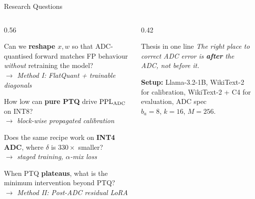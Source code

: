 \begin{frame}[shrink=10]{Research Questions}

  \begin{columns}[T]
    \begin{column}{0.56\textwidth}
      \footnotesize
      \begin{description}
        \setlength\itemsep{0.4em}
        \item[\color{mybluedark}\textbf{Q1}] Can we \textbf{reshape $x,w$} so that ADC-quantised forward matches FP behaviour \emph{without} retraining the model?\\
          \textit{\scriptsize $\to$ Method I: FlatQuant + trainable diagonals}
        \item[\color{mybluedark}\textbf{Q2}] How low can \textbf{pure PTQ} drive $\mathrm{PPL}_{\mathrm{ADC}}{}$ on INT8?\\
          \textit{\scriptsize $\to$ block-wise propagated calibration}
        \item[\color{mybluedark}\textbf{Q3}] Does the same recipe work on \textbf{INT4 ADC}, where $\delta$ is $330\times$ smaller?\\
          \textit{\scriptsize $\to$ staged training, $\alpha$-mix loss}
        \item[\color{mybluedark}\textbf{Q4}] When PTQ \textbf{plateaus}, what is the minimum intervention beyond PTQ?\\
          \textit{\scriptsize $\to$ Method II: Post-ADC residual LoRA}
      \end{description}
    \end{column}

    \begin{column}{0.42\textwidth}
      \small
      \begin{alertblock}{Thesis in one line}
        \emph{The right place to correct ADC error is \textbf{after} the ADC, not before it.}
      \end{alertblock}

      \vspace{0.8em}
      \footnotesize\textbf{Setup:} Llama-3.2-1B, WikiText-2 for calibration, WikiText-2 + C4 for evaluation, ADC spec\\ $b_a{=}8$, $k{=}16$, $M{=}256$.
    \end{column}
  \end{columns}
\end{frame}
